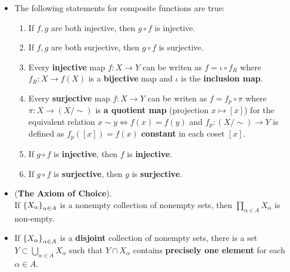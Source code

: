 \documentclass[11pt]{article}
\begin{document}
\begin{itemize}
\item \begin{proposition}
The following statements for composite functions are true:
\begin{enumerate}
\item If $f, g$ are both injective, then $g \circ f$ is injective. 
\item If $f, g$ are both surjective, then $g \circ f$ is surjective. 
\item Every \textbf{injective} map $f: X \rightarrow Y$ can be writen as $f = \iota \circ f_{R}$ where $f_R: X \rightarrow f(X)$ is a \textbf{bijective} map and $\iota$ is the \textbf{inclusion map}.
\item Every \textbf{surjective} map $f: X \rightarrow Y$ can be writen as $f =  f_{p} \circ \pi$ where $\pi: X\rightarrow (X/\sim)$ is \textbf{a quotient map} (projection $x \mapsto [x]$) for the equivalent relation $ x \sim y \Leftrightarrow f(x) = f(y)$ and  $f_p: (X/\sim) \rightarrow Y$ is defined as $f_p([x]) = f(x)$ \textbf{constant} in each coset $[x]$.
\item If $g \circ f$ is \textbf{injective}, then $f$ is \textbf{injective}.
\item If $g \circ f$ is \textbf{surjective}, then $g$ is \textbf{surjective}.
\end{enumerate}
\end{proposition}

\item \begin{principle} (\textbf{The Axiom of Choice}).\\
If $\left\{X_{\alpha}\right\}_{\alpha \in A}$ is a nonempty collection of nonempty sets, then $\prod_{\alpha \in A}X_{\alpha}$ is non-empty.
\end{principle}

\item \begin{corollary}
If $\left\{X_{\alpha}\right\}_{\alpha \in A}$ is a \textbf{disjoint} collection of nonempty sets, there is a set $Y \subset \bigcup_{\alpha \in A}X_{\alpha}$ such that $Y \cap X_{\alpha}$ contains \textbf{precisely one element} for each $\alpha \in A$.
\end{corollary}
\end{itemize}
\end{document}
